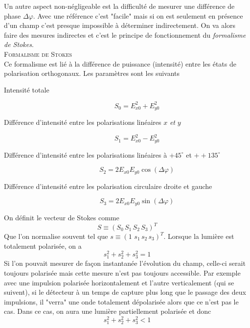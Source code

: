 	Un autre aspect non-négligeable est la difficulté de mesurer une différence de phase
	$\Delta \varphi$. Avec une référence c'est "facile" mais si on est seulement en présence
	d'un champ c'est presque impossible à déterminer indirectement. On va alors faire des mesures
	indirectes et c'est le principe de fonctionnement du \textit{formalisme de Stokes}.\\
\newpage	
	\textsc{Formalisme de Stokes}\\
	Ce formalisme est lié à la différence de puissance (intensité) entre les états de polarisation
	orthogonaux. Les paramètres sont les suivants
	
	\begin{description}
	\item[Intensité totale] 
	\begin{equation}
	{S_0} = E_{x0}^2 + E_{y0}^2
	\end{equation}
	\item[Différence d'intensité entre les polarisations linéaires $x$ \textit{et} $y$]
	\begin{equation}
	{S_1} = E_{x0}^2 - E_{y0}^2
	\end{equation}
	\item[Différence d'intensité entre les polarisations linéaires à $+45^\circ$ et $++135^\circ$]	
	\begin{equation}
	{S_2} = 2E_{x0}^{}E_{y0}^{}\cos (\Delta \varphi )
	\end{equation}
	\item[Différence d'intensité entre les polarisation circulaire droite et gauche]
	\begin{equation}
	{S_3} = 2E_{x0}^{}E_{y0}^{}\sin (\Delta \varphi )
	\end{equation}
	\end{description}
	On définit le vecteur de Stokes comme
	\begin{equation}
	S \equiv {({S_0}\,{S_1}\,{S_2}\,{S_3})^T}
	\end{equation}
	Que l'on normalise souvent tel que $s \equiv {(1\,\,{s_1}\,{s_2}\,{s_3})^T}$. Lorsque la
	lumière est totalement polarisée, on a
	\begin{equation}
	s_1^2 + s_2^2 + s_3^2 = 1
	\end{equation}
	Si l'on pouvait mesurer de façon instantanée l'évolution du champ, celle-ci serait
	toujours polarisée mais cette mesure n'est pas toujours accessible. Par exemple avec une 
	impulsion polarisée horizontalement et l'autre verticalement (qui se suivent), si le détecteur
	à un temps de capture plus long que le passage des deux impulsions, il "verra" une onde
	totalement dépolarisée  alors que ce n'est pas le cas. Dans ce cas, on aura une lumière
	partiellement polarisée et donc
	\begin{equation}
	s_1^2 + s_2^2 + s_3^2 < 1
	\end{equation}

